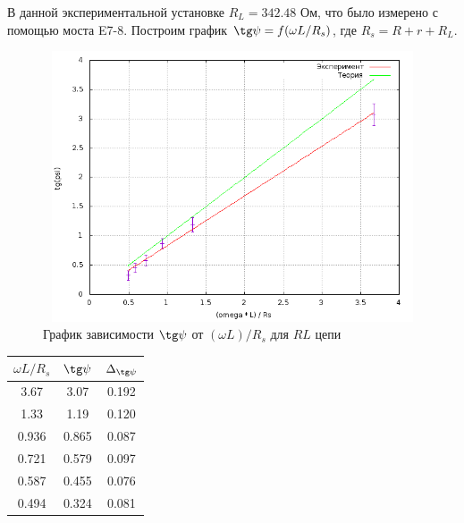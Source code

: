 \documentclass[12pt]{article}
\begin{document}
\begin{enumerate}
		В данной экспериментальной установке $R_L = 342.48$ Ом, что было измерено с помощью моста E7-8. Построим график $\tg \psi = f(\omega L / R_s)$, где $R_s = R + r + R_L$.
        \begin{figure}[h!]
			\centering
			\includegraphics[width = 15cm,height = 8cm]{plot2.png}
			\caption{График зависимости $\tg \psi$ от $ \left(\omega L\right) / R_s $ для $RL$ цепи}
			\label{plot2}
		\end{figure}
		\newpage
		\begin{table}[h!]
			\centering
			\begin{tabular}{|c|c|c|}
			\hline
			$\omega L / R_s$ & $\tg \psi$ & $\Delta_\text{$\tg \psi$}$ \\
			\hline
			3.67 & 3.07   & 0.192  \\
			\hline
			1.33 & 1.19   & 0.120\\
			\hline 
			0.936 & 0.865 & 0.087\\
			\hline
			0.721 & 0.579 & 0.097\\
			\hline
			0.587 & 0.455 & 0.076\\
			\hline
			0.494 & 0.324 & 0.081 \\						
			\hline
			\end{tabular}
			\label{table4}
		\end{table}		
\end{enumerate}
\end{document}
